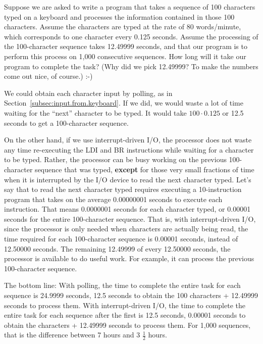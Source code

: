 \documentclass{patt}
\begin{document}
\begin{example}
Suppose we are asked to write a program that takes a sequence of 100
characters typed on a keyboard and processes the information contained
in those 100 characters.  Assume the characters are typed at the rate
of 80 words/minute, which corresponds to one character every 0.125
seconds.  Assume the processing of the 100-character sequence takes
12.49999 seconds, and that our program is to perform this process on
1,000 consecutive sequences.  How long will it take our program to
complete the task?  (Why did we pick 12.49999? To make the numbers
come out nice, of course.)  :-)

We could obtain each character input by polling, as in
Section~\ref{subsec:input.from.keyboard}.  If we did, we would waste a
lot of time waiting for the ``next'' character to be typed.  It would
take $100\cdot 0.125$ or 12.5 seconds to get a 100-character sequence.

On the other hand, if we use interrupt-driven I/O, the processor does
not waste any time re-executing the LDI and BR instructions while
waiting for a character to be typed.  Rather, the processor can be
busy working on the previous 100-character sequence that was typed,
{\bf except} for those very small fractions of time when it is
interrupted by the I/O device to read the next character typed.  Let's
say that to read the next character typed requires executing a
10-instruction program that takes on the average 0.00000001 seconds to
execute each instruction. That means 0.0000001 seconds for each
character typed, or 0.00001 seconds for the entire 100-character
sequence.  That is, with interrupt-driven I/O, since the processor is
only needed when characters are actually being read, the time required
for each 100-character sequence is 0.00001 seconds, instead of
12.50000 seconds.  The remaining 12.49999 of every 12.50000 seconds,
the processor is available to do useful work. For example, it can
process the previous 100-character sequence.

The bottom line: With polling, the time to complete the entire task
for each sequence is 24.9999 seconds, 12.5 seconds to obtain the 100
characters + 12.49999 seconds to process them.  With interrupt-driven
I/O, the time to complete the entire task for each sequence after the
first is 12.5 seconds, 0.00001 seconds to obtain the characters +
12.49999 seconds to process them.  For 1,000 sequences, that is the
difference between 7 hours and 3 ${\scriptstyle\frac{1}{2}}$ hours.
\end{example}
\endgroup
\end{document}
